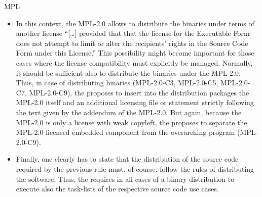 \begin{license}{MPL}
\begin{itemize}
\item In this context, the MPL-2.0 allows to distribute the binaries under terms
  of another license \enquote{[\ldots] provided that that the license for the
  Executable Form does not attempt to limit or alter the recipients’ rights in
  the Source Code Form under this License.} This possibility
  might become important for those cases where the license compatibility must
  explicitly be managed. Normally, it should be sufficient also to distribute
  the binaries under the MPL-2.0. Thus, in case of distributing binaries
  (MPL-2.0-C3, MPL-2.0-C5, MPL-2.0-C7, MPL-2.0-C9), the \oslic{} proposes to
  insert into the distribution packages the MPL-2.0 itself and an additional
  licensing file or statement strictly following the text given by the addendum
  of the MPL-2.0. But again, because the MPL-2.0 is only a
  license with weak copyleft, the \oslic{} proposes to separate the MPL-2.0
  licensed embedded component from the overarching program (MPL-2.0-C9).
  
\item Finally, one clearly has to state that the distribution of the source code
  required by the previous rule must, of course, follow the rules of distributing
  the software. Thus, the \oslic{} requires in all cases of a binary distribution
  to execute also the task-lists of the respective source code use cases.

\end{itemize}


\end{license}
%

